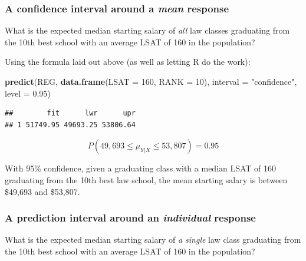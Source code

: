\documentclass[
]{book}
\newenvironment{Shaded}{\begin{snugshade}}{\end{snugshade}}
\newcommand{\AttributeTok}[1]{\textcolor[rgb]{0.13,0.29,0.53}{#1}}
\newcommand{\DecValTok}[1]{\textcolor[rgb]{0.00,0.00,0.81}{#1}}
\newcommand{\FloatTok}[1]{\textcolor[rgb]{0.00,0.00,0.81}{#1}}
\newcommand{\FunctionTok}[1]{\textcolor[rgb]{0.13,0.29,0.53}{\textbf{#1}}}
\newcommand{\NormalTok}[1]{#1}
\newcommand{\OtherTok}[1]{\textcolor[rgb]{0.56,0.35,0.01}{#1}}
\newcommand{\StringTok}[1]{\textcolor[rgb]{0.31,0.60,0.02}{#1}}
\begin{document}
\subsubsection*{\texorpdfstring{A confidence interval around a \emph{mean} response}{A confidence interval around a mean response}}\label{a-confidence-interval-around-a-mean-response}

What is the expected median starting salary of \emph{all} law classes graduating from the 10th best school with an average LSAT of 160 in the population?

Using the formula laid out above (as well as letting R do the work):

\begin{Shaded}
\begin{Highlighting}[]
\FunctionTok{predict}\NormalTok{(REG,}
        \FunctionTok{data.frame}\NormalTok{(}\StringTok{\textquotesingle{}LSAT\textquotesingle{}} \OtherTok{=} \DecValTok{160}\NormalTok{, }\StringTok{\textquotesingle{}RANK\textquotesingle{}} \OtherTok{=} \DecValTok{10}\NormalTok{),}
        \AttributeTok{interval =} \StringTok{"confidence"}\NormalTok{, }\AttributeTok{level =} \FloatTok{0.95}\NormalTok{)}
\end{Highlighting}
\end{Shaded}

\begin{verbatim}
##        fit      lwr      upr
## 1 51749.95 49693.25 53806.64
\end{verbatim}

\medskip

\[P \left(49,693 \leq \mu_{Y|X} 
\leq 53,807 \right) = 0.95\]

With 95\% confidence, given a graduating class with a median LSAT of 160 graduating from the 10th best law school, the mean starting salary is between \$49,693 and \$53,807.

\subsubsection*{\texorpdfstring{A prediction interval around an \emph{individual} response}{A prediction interval around an individual response}}\label{a-prediction-interval-around-an-individual-response}

What is the expected median starting salary of \emph{a single} law class graduating from the 10th best school with an average LSAT of 160 in the population?
\end{document}
